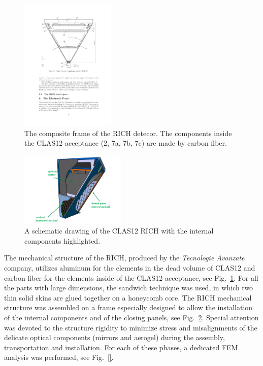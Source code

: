 \documentclass[final,5p,times,twocolumn]{elsarticle}
\begin{document}
\begin{figure}
\begin{center}
\includegraphics[width=0.40\textwidth]{EPS/Design_structure.pdf}
\caption{The composite frame of the RICH detecor. The components inside the CLAS12
acceptance (2, 7a, 7b, 7c) are made by carbon fiber.}
\label{fig:RICHframe}
\end{center}
\end{figure}

\begin{figure}
\begin{center}
\includegraphics[width=0.45\textwidth]{EPS/RICH.pdf}
\caption{A schematic drawing of the CLAS12 RICH with the internal components highlighted.}
\label{fig:RICHexplo}
\end{center}
\end{figure}

The mechanical structure of the RICH, produced by the {\it Tecnologie Avanzate}~\cite{REF:Tecnavan} company, utilizes aluminum for 
the elements in the dead volume of CLAS12 and carbon fiber for the elements inside of the CLAS12 acceptance, see Fig.~\ref{fig:RICHframe}. 
For all the parts with large dimensions, the sandwich technique was used, in which two thin solid skins are glued together on a honeycomb core. 
The RICH mechanical structure was assembled on a frame especially designed to allow the installation of the internal components 
and of the closing panels, see Fig.~\ref{fig:RICHexplo}. 
Special attention was devoted to the structure rigidity to minimize stress and misalignments of the 
delicate optical components (mirrors and aerogel) during the assembly, transportation and installation.
For each of these phases, a dedicated FEM analysis was performed, see Fig.~\ref{}.
\end{document}
